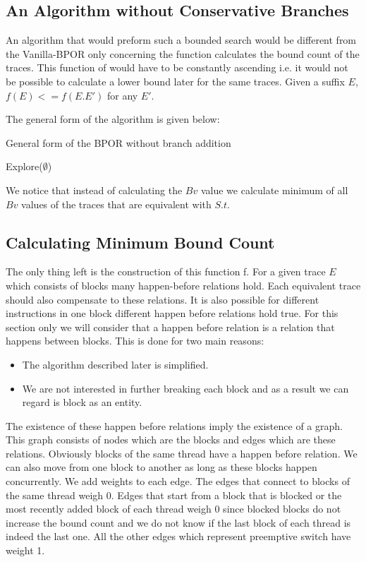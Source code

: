 \subsection{An Algorithm without Conservative Branches}
An algorithm that would preform such a bounded search would be different from the Vanilla-BPOR only concerning the function calculates the bound count of the traces.
This function of would have to be constantly ascending i.e. it would not be possible to calculate a lower bound later for the same traces.
Given a suffix $E$, $f(E) <= f(E.E')$ for any $E'$.

The general form of the algorithm is given below:

\begin{algorithm}[H]
    \SetAlgoLined
    \caption{General form of the BPOR without branch addition}
    Explore($\emptyset$)\;
\end{algorithm}

We notice that instead of calculating the $Bv$ value we calculate minimum of all $Bv$ values of the traces that are equivalent with $S.t$.

\subsection{Calculating Minimum Bound Count}
The only thing left is the construction of this function f.
For a given trace $E$ which consists of blocks many happen-before relations hold. Each equivalent trace should also compensate to these relations.
It is also possible for different instructions in one block different happen before relations hold true. For this section only we will consider that 
a happen before relation is a relation that happens between blocks. This is done for two main reasons:

\begin{itemize}
    \item The algorithm described later is simplified.
    \item We are not interested in further breaking each block and as a result we can regard is block as an entity.
\end{itemize}

The existence of these happen before relations imply the existence of a graph. This graph consists of nodes which are the blocks and edges which are these
relations. Obviously blocks of the same thread have a happen before relation. We can also move from one block to another as long as these blocks happen
concurrently. We add weights to each edge. The edges that connect to blocks of the same thread weigh 0. Edges that start from a block that 
is blocked or the most recently added block of each thread weigh 0 since blocked blocks do not increase the bound count and we do not know if the last block of
each thread is indeed the last one. All the other edges which represent preemptive switch have weight 1.

